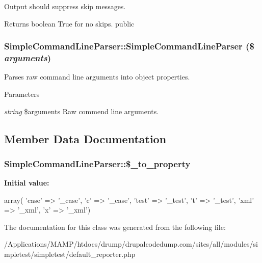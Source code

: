 \label{class_simple_command_line_parser_a61634a1ea5fd4638199ed0a7e5a55115}
Output should suppress skip messages. \begin{DoxyReturn}{Returns}
boolean True for no skips.  public 
\end{DoxyReturn}
\hypertarget{class_simple_command_line_parser_a473ff2d1b54f42f744ecd5d1ab597b38}{
\subsubsection[{SimpleCommandLineParser}]{\setlength{\rightskip}{0pt plus 5cm}SimpleCommandLineParser::SimpleCommandLineParser (\$ {\em arguments})}}
\label{class_simple_command_line_parser_a473ff2d1b54f42f744ecd5d1ab597b38}
Parses raw command line arguments into object properties. 
\begin{DoxyParams}{Parameters}
\item[{\em string}]\$arguments Raw commend line arguments. \end{DoxyParams}


\subsection{Member Data Documentation}
\hypertarget{class_simple_command_line_parser_a155abe2c627c6dcd7edfeb62e3ab6980}{
\subsubsection[{\$\_\-to\_\-property}]{\setlength{\rightskip}{0pt plus 5cm}SimpleCommandLineParser::\$\_\-to\_\-property}}
\label{class_simple_command_line_parser_a155abe2c627c6dcd7edfeb62e3ab6980}
{\bfseries Initial value:}
\begin{DoxyCode}
 array(
            'case' => '_case', 'c' => '_case',
            'test' => '_test', 't' => '_test',
            'xml' => '_xml', 'x' => '_xml')
\end{DoxyCode}


The documentation for this class was generated from the following file:\begin{DoxyCompactItemize}
\item 
/Applications/MAMP/htdocs/drump/drupalcodedump.com/sites/all/modules/simpletest/simpletest/default\_\-reporter.php\end{DoxyCompactItemize}
